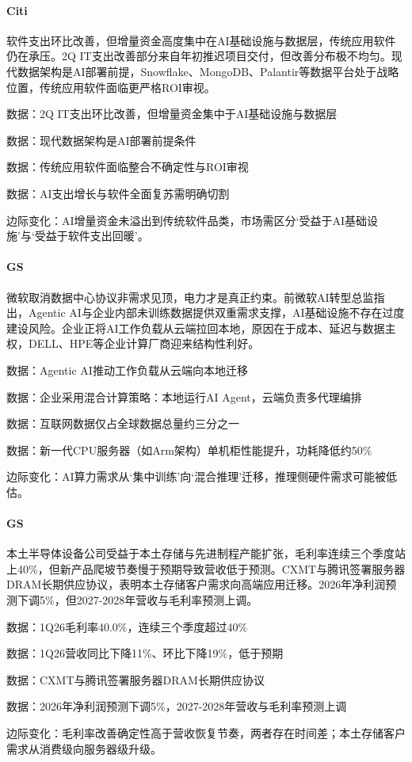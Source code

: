 \documentclass[11pt]{ctexart}
\begin{document}
\paragraph{Citi} 软件支出环比改善，但增量资金高度集中在AI基础设施与数据层，传统应用软件仍在承压。2Q IT支出改善部分来自年初推迟项目交付，但改善分布极不均匀。现代数据架构是AI部署前提，Snowflake、MongoDB、Palantir等数据平台处于战略位置，传统应用软件面临更严格ROI审视。
{\small\color{refgray}数据：2Q IT支出环比改善，但增量资金集中于AI基础设施与数据层\par}
{\small\color{refgray}数据：现代数据架构是AI部署前提条件\par}
{\small\color{refgray}数据：传统应用软件面临整合不确定性与ROI审视\par}
{\small\color{refgray}数据：AI支出增长与软件全面复苏需明确切割\par}
{\small\color{refgray}边际变化：AI增量资金未溢出到传统软件品类，市场需区分‘受益于AI基础设施’与‘受益于软件支出回暖’。\par}
\paragraph{GS} 微软取消数据中心协议非需求见顶，电力才是真正约束。前微软AI转型总监指出，Agentic AI与企业内部未训练数据提供双重需求支撑，AI基础设施不存在过度建设风险。企业正将AI工作负载从云端拉回本地，原因在于成本、延迟与数据主权，DELL、HPE等企业计算厂商迎来结构性利好。
{\small\color{refgray}数据：Agentic AI推动工作负载从云端向本地迁移\par}
{\small\color{refgray}数据：企业采用混合计算策略：本地运行AI Agent，云端负责多代理编排\par}
{\small\color{refgray}数据：互联网数据仅占全球数据总量约三分之一\par}
{\small\color{refgray}数据：新一代CPU服务器（如Arm架构）单机柜性能提升，功耗降低约50\%\par}
{\small\color{refgray}边际变化：AI算力需求从‘集中训练’向‘混合推理’迁移，推理侧硬件需求可能被低估。\par}
\paragraph{GS} 本土半导体设备公司受益于本土存储与先进制程产能扩张，毛利率连续三个季度站上40\%，但新产品爬坡节奏慢于预期导致营收低于预测。CXMT与腾讯签署服务器DRAM长期供应协议，表明本土存储客户需求向高端应用迁移。2026年净利润预测下调5\%，但2027-2028年营收与毛利率预测上调。
{\small\color{refgray}数据：1Q26毛利率40.0\%，连续三个季度超过40\%\par}
{\small\color{refgray}数据：1Q26营收同比下降11\%、环比下降19\%，低于预期\par}
{\small\color{refgray}数据：CXMT与腾讯签署服务器DRAM长期供应协议\par}
{\small\color{refgray}数据：2026年净利润预测下调5\%，2027-2028年营收与毛利率预测上调\par}
{\small\color{refgray}边际变化：毛利率改善确定性高于营收恢复节奏，两者存在时间差；本土存储客户需求从消费级向服务器级升级。\par}
\end{document}
